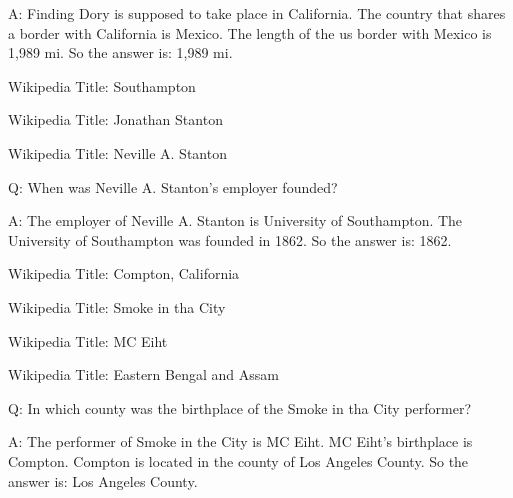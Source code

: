 \documentclass[
]{article}
\begin{document}
A: Finding Dory is supposed to take place in California. The country
that shares a border with California is Mexico. The length of the us
border with Mexico is 1,989 mi. So the answer is: 1,989 mi.

Wikipedia Title: Southampton

Wikipedia Title: Jonathan Stanton

Wikipedia Title: Neville A. Stanton

Q: When was Neville A. Stanton's employer founded?

A: The employer of Neville A. Stanton is University of Southampton. The
University of Southampton was founded in 1862. So the answer is: 1862.

Wikipedia Title: Compton, California

Wikipedia Title: Smoke in tha City

Wikipedia Title: MC Eiht

Wikipedia Title: Eastern Bengal and Assam

Q: In which county was the birthplace of the Smoke in tha City
performer?

A: The performer of Smoke in the City is MC Eiht. MC Eiht's birthplace
is Compton. Compton is located in the county of Los Angeles County. So
the answer is: Los Angeles County.
\end{document}
